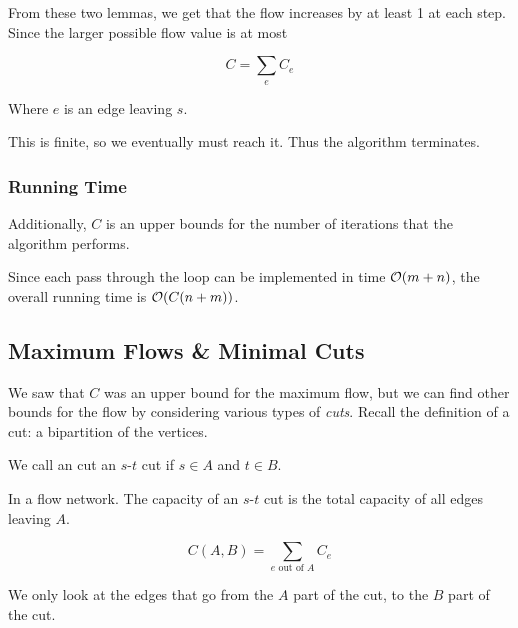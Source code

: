 \documentclass[12pt]{article}
\begin{document}
  From these two lemmas, we get that the flow increases by at least 1 at each
  step. Since the larger possible flow value is at most

  \[
    C = \sum_{e} C_e
  \]

  Where $e$ is an edge leaving $s$.

  This is finite, so we eventually must reach it. Thus the algorithm terminates.


  \subsubsection{Running Time}

  Additionally, $C$ is an upper bounds for the number of iterations that the
  algorithm performs.

  Since each pass through the loop can be implemented in time $\mathcal O(m + n)$, the
  overall running time is $\mathcal O(C(n + m))$.

  \subsection{Maximum Flows \& Minimal Cuts}

  We saw that $C$ was an upper bound for the maximum flow, but we can find other
  bounds for the flow by considering various types of {\it cuts}. Recall the
  definition of a cut: a bipartition of the vertices.

  \Definition {} {
    We call an cut an $s$-$t$ cut if $s \in A$ and $t \in B$.
  }

  In a flow network. The capacity of an $s$-$t$ cut is the total capacity of all
  edges leaving $A$.

  \[
    C(A, B) = \sum_{e \text{ out of } A} C_e
  \]

  We only look at the edges that go from the $A$ part of the cut, to the $B$
  part of the cut.
\end{document}
